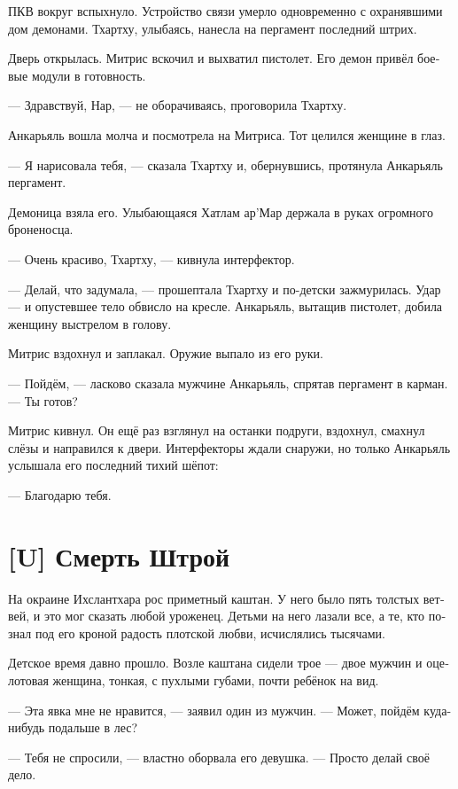 \documentclass[a4paper,12pt,fleqn]{book}\usepackage{polyglossia}\setdefaultlanguage[babelshorthands=true]{russian}\setotherlanguage{english}\defaultfontfeatures{Ligatures=TeX,Mapping=tex-text}\usepackage{xcolor}\newcommand{\ml}[3]{#2}
\newcommand{\textspace}{\vspace{1em}{\centering\Large\bfseries<...>\par}\vspace{1em}}
\begin{document}
ПКВ вокруг вспыхнуло.
Устройство связи умерло одновременно с охранявшими дом демонами.
Тхартху, улыбаясь, нанесла на пергамент последний штрих.

Дверь открылась.
Митрис вскочил и выхватил пистолет.
Его демон привёл боевые модули в готовность.

--- Здравствуй, Нар, --- не оборачиваясь, проговорила Тхартху.

Анкарьяль вошла молча и посмотрела на Митриса.
Тот целился женщине в глаз.

--- Я нарисовала тебя, --- сказала Тхартху и, обернувшись, протянула Анкарьяль пергамент.

Демоница взяла его.
Улыбающаяся Хатлам ар’Мар держала в руках огромного броненосца.

--- Очень красиво, Тхартху, --- кивнула интерфектор.

--- Делай, что задумала, --- прошептала Тхартху и по-детски зажмурилась.
Удар --- и опустевшее тело обвисло на кресле.
Анкарьяль, вытащив пистолет, добила женщину выстрелом в голову.

Митрис вздохнул и заплакал.
Оружие выпало из его руки.

--- Пойдём, --- ласково сказала мужчине Анкарьяль, спрятав пергамент в карман.
--- Ты готов?

Митрис кивнул.
Он ещё раз взглянул на останки подруги, вздохнул, смахнул слёзы и направился к двери.
Интерфекторы ждали снаружи, но только Анкарьяль услышала его последний тихий шёпот:

--- Благодарю тебя.

\section{[U] Смерть Штрой}

\textspace

На окраине Ихслантхара рос приметный каштан.
У него было пять толстых ветвей, и это мог сказать любой уроженец.
Детьми на него лазали все, а те, кто познал под его кроной радость плотской любви, исчислялись тысячами.

Детское время давно прошло.
Возле каштана сидели трое --- двое мужчин и оцелотовая женщина, тонкая, с пухлыми губами, почти ребёнок на вид.

--- Эта явка мне не нравится, --- заявил один из мужчин.
--- Может, пойдём куда-нибудь подальше в лес?

--- Тебя не спросили, --- властно оборвала его девушка.
--- Просто делай своё дело.
\end{document}
